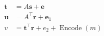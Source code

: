 \documentclass[border=6pt]{standalone}
\begin{document}
\color{ptitnavy}
\(\displaystyle \begin{aligned}\mathbf{t}&=A\mathbf{s}+\mathbf{e}\\\mathbf{u}&=A^\top\mathbf{r}+\mathbf{e}_1\\v&=\mathbf{t}^\top\mathbf{r}+e_2+\operatorname{Encode}(m)\end{aligned}\)
\end{document}
